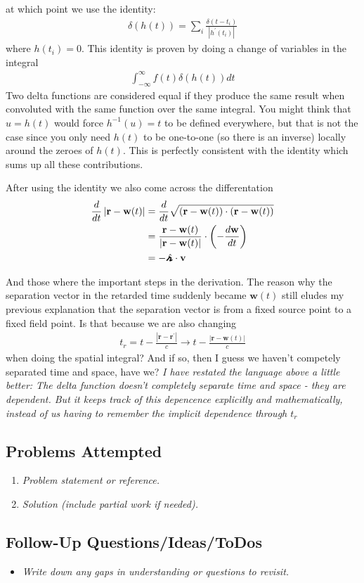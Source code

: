 at which point we use the identity: \begin{align*}
    \delta (h(t)) = \sum_{i} \frac{\delta (t - t_i)}{\left| h^{\prime} (t_i) \right| } 
\end{align*}
where \(h(t_i) = 0\). This identity is proven by doing a change of variables in the integral \begin{align*}
    \int _{- \infty}^{\infty} f(t) \delta (h(t)) dt
\end{align*} 
Two delta functions are considered equal if they produce the same result when convoluted with the same function over the same integral. You might think that \(u = h(t)\) would force \(h^{-1}(u) = t\) to be defined everywhere, but that is not the case since you only need \(h(t)\) to be one-to-one (so there is an inverse) locally around the zeroes of \(h(t)\). This is perfectly consistent with the identity which sums up all these contributions.

After using the identity we also come across the differentation \begin{align*}
    \frac{d}{dt} \left| \mathbf{r} - \mathbf{w}(t)\right| &= \frac{d}{dt} \sqrt{(\mathbf{r} - \mathbf{w}(t)) \cdot (\mathbf{r} - \mathbf{w}(t))} \\
    &= \frac{\mathbf{r} - \mathbf{w}(t)}{\left| \mathbf{r} - \mathbf{w}(t) \right| } \cdot \left( - \frac{d \mathbf{w}}{dt} \right) \\
    &= - \hatgriffr \cdot  \mathbf{v}
\end{align*}

And those where the important steps in the derivation. The reason why the separation vector in the retarded time suddenly became \(\mathbf{w}(t)\) still eludes my previous explanation that the separation vector is from a fixed source point to a fixed field point. Is that because we are also changing \begin{align*}
    t_r = t - \frac{\left| \mathbf{r} - \mathbf{r}^{\prime}  \right| }{c} \to t - \frac{\left| \mathbf{r} - \mathbf{w}(t) \right| }{c}
\end{align*}
when doing the spatial integral? And if so, then I guess we haven't competely separated time and space, have we? \textit{I have restated the language above a little better: The delta function doesn't completely separate time and space - they \emph{are} dependent. But it keeps track of this depencence explicitly and mathematically, instead of us having to remember the implicit dependence through \(t_r\)}

\subsection*{Problems Attempted}
\begin{enumerate}
    \item \textit{Problem statement or reference.}
    \item \textit{Solution (include partial work if needed).}
\end{enumerate}

\subsection*{Follow-Up Questions/Ideas/ToDos}
\begin{itemize}
    \item \textit{Write down any gaps in understanding or questions to revisit.}
\end{itemize}
